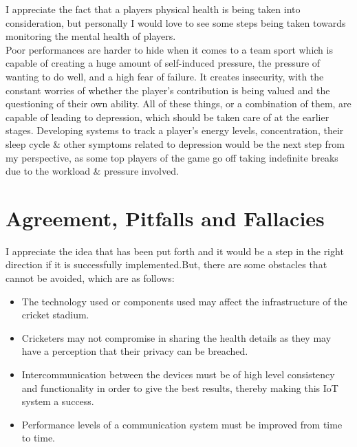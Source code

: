 \documentclass{Cricketer's Health Supervision}
\begin{document}
     I appreciate the fact that a players physical health is being taken into consideration, but personally I would love to see some steps being taken towards monitoring the mental health of players.\\
    
    Poor performances are harder to hide when it comes to a team sport which is capable of creating a huge amount of self-induced pressure, the pressure of wanting to do well, and a high fear of failure. It creates insecurity, with the constant worries of whether the player's contribution is being valued and the questioning of their own ability. All of these things, or a combination of them, are capable of leading to depression, which should be taken care of at the earlier stages. Developing systems to track a player's energy levels, concentration, their sleep cycle \& other symptoms related to depression would be the next step from my perspective, as some top players of the game go off taking indefinite breaks due to the workload \& pressure involved.
    
    \section*{Agreement, Pitfalls and Fallacies}
    I appreciate the idea that has been put forth and it would be a step in the right direction if it is successfully implemented.But, there are some obstacles that cannot be avoided, which are as follows:
    
    \begin{itemize}
        \item The technology used or components used may affect the infrastructure of the cricket stadium. 
        \item Cricketers may not compromise in sharing the health details as they may have a perception that their privacy can be breached.
        \item Intercommunication between the devices must be of high level consistency and functionality in order to give the best results, thereby making this IoT system a success.
        \item Performance levels of a communication system must be improved from time to time.
    \end{itemize}
\end{document}
